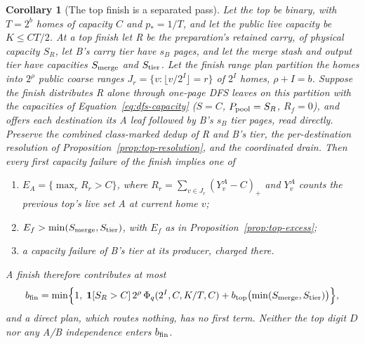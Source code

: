 \documentclass[11pt]{article}
\newtheorem{corollary}[theorem]{Corollary}
\theoremstyle{definition}
\theoremstyle{remark}
\newcommand{\ind}{\mathbf 1}
\begin{document}
\begin{corollary}[The top finish is a separated pass]
\label{cor:top-finish-separated}
Let the top be binary, with $T=2^b$ homes of capacity $C$ and $p_*=1/T$,
and let the public live capacity be $K\le CT/2$. At a top finish let R be
the preparation's retained carry, of physical capacity $S_R$, let B's
carry tier have $s_B$ pages, and let the merge stash and output tier have
capacities $S_{\rm merge}$ and $S_{\rm tier}$. Let the finish range plan
partition the homes into $2^\rho$ public coarse ranges
$J_r=\{v:\lfloor v/2^I\rfloor=r\}$ of $2^I$ homes, $\rho+I=b$. Suppose the
finish distributes R alone through one-page DFS leaves on this partition
with the capacities of Equation~\eqref{eq:dfs-capacity} ($S=C$,
$P_{\rm pool}=S_R$, $R_f=0$), and offers each destination its A leaf
followed by B's $s_B$ tier pages, read directly. Preserve the combined
class-marked dedup of R and B's tier, the
per-destination resolution of Proposition~\ref{prop:top-resolution}, and
the coordinated drain. Then every first capacity failure of the finish
implies one of
\begin{enumerate}
\item $E_A=\{\max_r R_r>C\}$, where $R_r=\sum_{v\in J_r}(Y^A_v-C)_+$ and
      $Y^A_v$ counts the previous top's live set A at current home $v$;
\item $E_f>\min(S_{\rm merge},S_{\rm tier})$, with $E_f$ as in
      Proposition~\ref{prop:top-excess};
\item a capacity failure of B's tier at its producer, charged there.
\end{enumerate}
A finish therefore contributes at most
\[
 b_{\rm fin}=\min\Bigl\{1,\;\ind[S_R>C]\,2^\rho\,\Phi_q(2^I,C,K/T,C)
   +b_{\rm top}\bigl(\min(S_{\rm merge},S_{\rm tier})\bigr)\Bigr\},
\]
and a direct plan, which routes nothing, has no first term. Neither the
top digit $D$ nor any A/B independence enters $b_{\rm fin}$.
\end{corollary}
\end{document}
